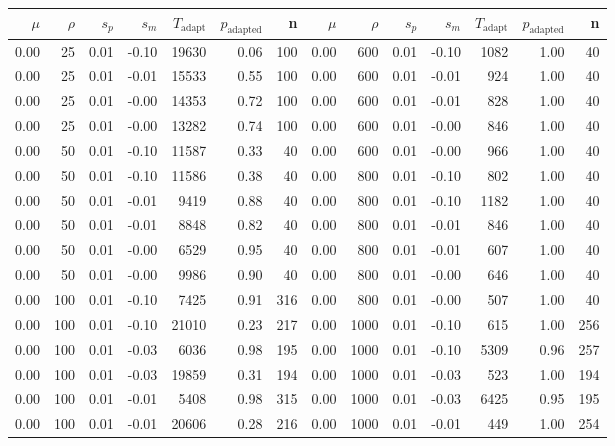 \begin{table}[ht]
\centering
{\tiny
\begin{tabular}{|rrrrrrr||rrrrrrr|}
  \hline
$\mu$ & $\rho$ & $s_p$ & $s_m$ & $T_\text{adapt}$ & $p_\text{adapted}$ & n & $\mu$ & $\rho$ & $s_p$ & $s_m$ & $T_\text{adapt}$ & $p_\text{adapted}$ & n \\ 
  \hline
0.00 & 25 & 0.01 & -0.10 & 19630 & 0.06 & 100 & 0.00 & 600 & 0.01 & -0.10 & 1082 & 1.00 & 40 \\ 
  0.00 & 25 & 0.01 & -0.01 & 15533 & 0.55 & 100 & 0.00 & 600 & 0.01 & -0.01 & 924 & 1.00 & 40 \\ 
  0.00 & 25 & 0.01 & -0.00 & 14353 & 0.72 & 100 & 0.00 & 600 & 0.01 & -0.01 & 828 & 1.00 & 40 \\ 
  0.00 & 25 & 0.01 & -0.00 & 13282 & 0.74 & 100 & 0.00 & 600 & 0.01 & -0.00 & 846 & 1.00 & 40 \\ 
  0.00 & 50 & 0.01 & -0.10 & 11587 & 0.33 & 40 & 0.00 & 600 & 0.01 & -0.00 & 966 & 1.00 & 40 \\ 
  0.00 & 50 & 0.01 & -0.10 & 11586 & 0.38 & 40 & 0.00 & 800 & 0.01 & -0.10 & 802 & 1.00 & 40 \\ 
  0.00 & 50 & 0.01 & -0.01 & 9419 & 0.88 & 40 & 0.00 & 800 & 0.01 & -0.10 & 1182 & 1.00 & 40 \\ 
  0.00 & 50 & 0.01 & -0.01 & 8848 & 0.82 & 40 & 0.00 & 800 & 0.01 & -0.01 & 846 & 1.00 & 40 \\ 
  0.00 & 50 & 0.01 & -0.00 & 6529 & 0.95 & 40 & 0.00 & 800 & 0.01 & -0.01 & 607 & 1.00 & 40 \\ 
  0.00 & 50 & 0.01 & -0.00 & 9986 & 0.90 & 40 & 0.00 & 800 & 0.01 & -0.00 & 646 & 1.00 & 40 \\ 
  0.00 & 100 & 0.01 & -0.10 & 7425 & 0.91 & 316 & 0.00 & 800 & 0.01 & -0.00 & 507 & 1.00 & 40 \\ 
  0.00 & 100 & 0.01 & -0.10 & 21010 & 0.23 & 217 & 0.00 & 1000 & 0.01 & -0.10 & 615 & 1.00 & 256 \\ 
  0.00 & 100 & 0.01 & -0.03 & 6036 & 0.98 & 195 & 0.00 & 1000 & 0.01 & -0.10 & 5309 & 0.96 & 257 \\ 
  0.00 & 100 & 0.01 & -0.03 & 19859 & 0.31 & 194 & 0.00 & 1000 & 0.01 & -0.03 & 523 & 1.00 & 194 \\ 
  0.00 & 100 & 0.01 & -0.01 & 5408 & 0.98 & 315 & 0.00 & 1000 & 0.01 & -0.03 & 6425 & 0.95 & 195 \\ 
  0.00 & 100 & 0.01 & -0.01 & 20606 & 0.28 & 216 & 0.00 & 1000 & 0.01 & -0.01 & 449 & 1.00 & 254 \\ 

\end{tabular}}
\end{table}
